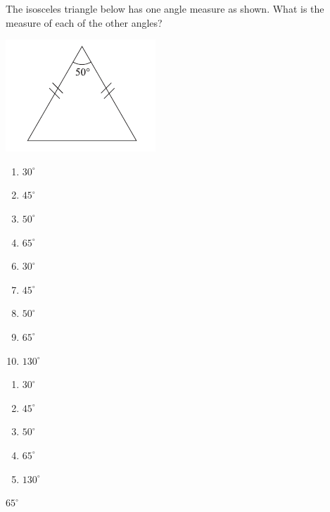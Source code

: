 
\pagebreak

  The isosceles triangle below has one angle measure as
shown. What is the measure of each of the other angles?

\includegraphics[scale=.9]{support/Capture3.png}



\ifsat
	\begin{enumerate}[label=\Alph*)]
		\item   $30^{\circ}$
		\item  $45^{\circ}$
		\item  $50^{\circ}$
		\item  $65^{\circ}$%
	\end{enumerate}
\else
\fi

\ifacteven
	\begin{enumerate}[label=\textbf{\Alph*.},itemsep=\fill,align=left]
		\setcounter{enumii}{5}
		\item   $30^{\circ}$
		\item  $45^{\circ}$
		\item  $50^{\circ}$
		\addtocounter{enumii}{1}
		\item  $65^{\circ}$%
		\item  $130^{\circ}$
	\end{enumerate}
\else
\fi

\ifactodd
	\begin{enumerate}[label=\textbf{\Alph*.},itemsep=\fill,align=left]
		\item   $30^{\circ}$
		\item  $45^{\circ}$
		\item  $50^{\circ}$
		\item  $65^{\circ}$%
		\item  $130^{\circ}$
	\end{enumerate}
\else
\fi

\ifgridin
  $65^{\circ}$%

\else
\fi

